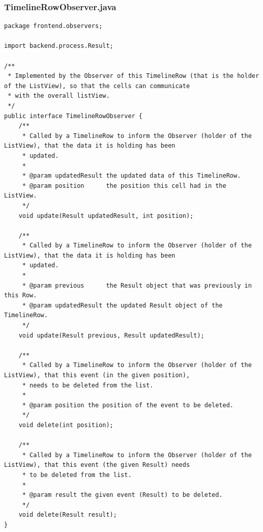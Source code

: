 \subsubsection{TimelineRowObserver.java}
\begin{lstlisting}
package frontend.observers;

import backend.process.Result;

/**
 * Implemented by the Observer of this TimelineRow (that is the holder of the ListView), so that the cells can communicate
 * with the overall listView.
 */
public interface TimelineRowObserver {
    /**
     * Called by a TimelineRow to inform the Observer (holder of the ListView), that the data it is holding has been
     * updated.
     *
     * @param updatedResult the updated data of this TimelineRow.
     * @param position      the position this cell had in the ListView.
     */
    void update(Result updatedResult, int position);

    /**
     * Called by a TimelineRow to inform the Observer (holder of the ListView), that the data it is holding has been
     * updated.
     *
     * @param previous      the Result object that was previously in this Row.
     * @param updatedResult the updated Result object of the TimelineRow.
     */
    void update(Result previous, Result updatedResult);

    /**
     * Called by a TimelineRow to inform the Observer (holder of the ListView), that this event (in the given position),
     * needs to be deleted from the list.
     *
     * @param position the position of the event to be deleted.
     */
    void delete(int position);

    /**
     * Called by a TimelineRow to inform the Observer (holder of the ListView), that this event (the given Result) needs
     * to be deleted from the list.
     *
     * @param result the given event (Result) to be deleted.
     */
    void delete(Result result);
}
\end{lstlisting}
